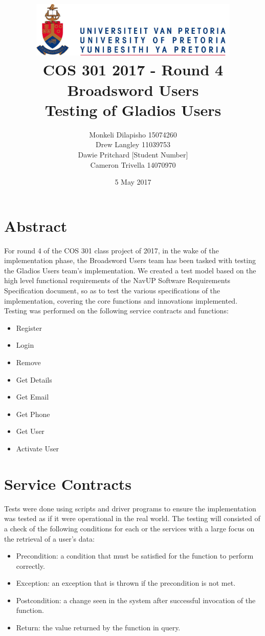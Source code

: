 \documentclass[12pt]{article}
\title{ \includegraphics[width=10cm]{up} \\ [0.5cm] COS 301 2017 - Round 4\\ Broadsword Users\\ Testing of Gladios Users }
\author{Monkeli Dilapisho \hfill 15074260 \\ Drew Langley \hfill 11039753 \\ Dawie Pritchard \hfill [Student Number] \\ Cameron Trivella \hfill 14070970}
\date{5 May 2017}
\begin{document}
\maketitle
\pagebreak
\tableofcontents
\pagebreak


\section{Abstract}
	For round 4 of the COS 301 class project of 2017, in the wake of the implementation phase, the Broadsword Users team has been tasked with testing the Gladios Users team's 		implementation. We created a test model based on the high level functional requirements of the NavUP Software Requirements Specification document, so as to test the various 		specifications of the implementation, covering the core functions and innovations implemented.
	\\ 
	Testing was performed on the following service contracts and functions:
	\begin{itemize}
		\item Register
		\item Login
		\item Remove
		\item Get Details
		\item Get Email
		\item Get Phone 
		\item Get User
		\item Activate User
	\end{itemize}	

\pagebreak
	
\section{Service Contracts}
Tests were done using scripts and driver programs to ensure the implementation was tested as if it were operational in the real world.	
	\noindent The testing will consisted of a check of the following conditions for each or the services with a large focus on the retrieval of a user's data:\\
	 	
	 	\begin{itemize}
		\item Precondition: a condition that must be satisfied for the function to perform correctly.
		\item Exception: an exception that is thrown if the precondition is not met.
		\item Postcondition: a change seen in the system after successful invocation of the function.
		\item Return: the value returned by the function in query.
		\end{itemize}
			
\end{document}
